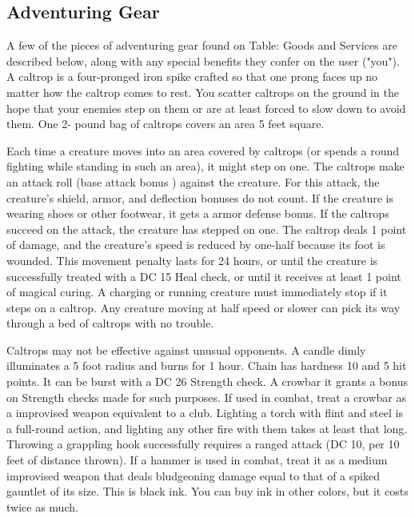\subsection{Adventuring Gear}
A few of the pieces of adventuring gear found on Table: Goods and Services are described below, along with any special benefits they confer on the user ("you").
 A caltrop is a four-pronged iron spike crafted so that one prong faces up no matter how the caltrop comes to rest. You scatter caltrops on the ground in the hope that your enemies step on them or are at least forced to slow down to avoid them. One 2- pound bag of caltrops covers an area 5 feet square.
\par Each time a creature moves into an area covered by caltrops (or spends a round fighting while standing in such an area), it might step on one. The caltrops make an attack roll (base attack bonus ) against the creature. For this attack, the creature's shield, armor, and deflection bonuses do not count. If the creature is wearing shoes or other footwear, it gets a  armor defense bonus. If the caltrops succeed on the attack, the creature has stepped on one. The caltrop deals 1 point of damage, and the creature's speed is reduced by one-half because its foot is wounded. This movement penalty lasts for 24 hours, or until the creature is successfully treated with a DC 15 Heal check, or until it receives at least 1 point of magical curing. A charging or running creature must immediately stop if it steps on a caltrop. Any creature moving at half speed or slower can pick its way through a bed of caltrops with no trouble.
\par Caltrops may not be effective against unusual opponents.
 A candle dimly illuminates a 5 foot radius and burns for 1 hour.
 Chain has hardness 10 and 5 hit points. It can be burst with a DC 26 Strength check.
 A crowbar it grants a  bonus on Strength checks made for such purposes. If used in combat, treat a crowbar as a improvised weapon equivalent to a club.
 Lighting a torch with flint and steel is a full-round action, and lighting any other fire with them takes at least that long.
 Throwing a grappling hook successfully requires a ranged attack (DC 10,  per 10 feet of distance thrown).
 If a hammer is used in combat, treat it as a medium improvised weapon that deals bludgeoning damage equal to that of a spiked gauntlet of its size.
 This is black ink. You can buy ink in other colors, but it costs twice as much.
